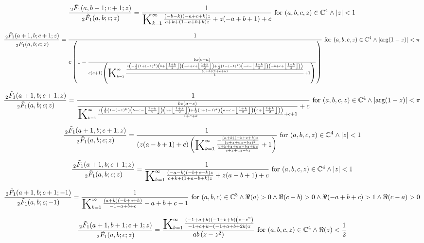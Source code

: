 \documentclass{article}
\newcommand{\bigK}{\mathop{\raisebox{-5pt}{\huge K}}}
\begin{document}
\[\frac{\, _2\tilde{F}_1(a,b+1;c+1;z)}{\, _2\tilde{F}_1(a,b;c;z)}=\frac{1}{\bigK_{k=1}^{\infty}\frac{(-b-k) (-a+c+k) z}{c+k+(1-a+b+k) z}+z (-a+b+1)+c}\text{ for }(a,b,c,z)\in \mathbb{C}^4\land \left| z\right| <1\] 

\[\frac{\, _2\tilde{F}_1(a+1,b;c+1;z)}{\, _2\tilde{F}_1(a,b;c;z)}=\frac{1}{c \left(1-\frac{b z (c-a)}{c (c+1) \left(\bigK_{k=1}^{\infty}\frac{\frac{z \left(-\frac{1}{2} \left(1+(-1)^k\right) \left(b+\left\lfloor \frac{1+k}{2}\right\rfloor \right) \left(-a+c+\left\lfloor \frac{1+k}{2}\right\rfloor \right)+\frac{1}{2} \left(1-(-1)^k\right) \left(-a-\left\lfloor \frac{1+k}{2}\right\rfloor \right) \left(-b+c+\left\lfloor \frac{1+k}{2}\right\rfloor \right)\right)}{(c+k) (1+c+k)}}{1}+1\right)}\right)}\text{ for }(a,b,c,z)\in \mathbb{C}^4\land \left| \arg (1-z)\right| <\pi\] 

\[\frac{\, _2\tilde{F}_1(a+1,b;c+1;z)}{\, _2\tilde{F}_1(a,b;c;z)}=\frac{1}{\frac{b z (a-c)}{\bigK_{k=1}^{\infty}\frac{z \left(\frac{1}{2} \left(1-(-1)^k\right) \left(b-c-\left\lfloor \frac{1+k}{2}\right\rfloor \right) \left(a+\left\lfloor \frac{1+k}{2}\right\rfloor \right)+\frac{1}{2} \left(1+(-1)^k\right) \left(a-c-\left\lfloor \frac{1+k}{2}\right\rfloor \right) \left(b+\left\lfloor \frac{1+k}{2}\right\rfloor \right)\right)}{1+c+k}+c+1}+c}\text{ for }(a,b,c,z)\in \mathbb{C}^4\land \left| \arg (1-z)\right| <\pi\] 

\[\frac{\, _2\tilde{F}_1(a+1,b;c+1;z)}{\, _2\tilde{F}_1(a,b;c;z)}=\frac{1}{(z (a-b+1)+c) \left(\bigK_{k=1}^{\infty}\frac{-\frac{(a+k) (-b+c+k) z}{(c+z+a z-b z)^2}}{\frac{c+k+z+a z-b z+k z}{c+z+a z-b z}}+1\right)}\text{ for }(a,b,c,z)\in \mathbb{C}^4\land \left| z\right| <1\] 

\[\frac{\, _2\tilde{F}_1(a+1,b;c+1;z)}{\, _2\tilde{F}_1(a,b;c;z)}=\frac{1}{\bigK_{k=1}^{\infty}\frac{(-a-k) (-b+c+k) z}{c+k+(1+a-b+k) z}+z (a-b+1)+c}\text{ for }(a,b,c,z)\in \mathbb{C}^4\land \left| z\right| <1\] 

\[\frac{\, _2\tilde{F}_1(a+1,b;c+1;-1)}{\, _2\tilde{F}_1(a,b;c;-1)}=\frac{1}{\bigK_{k=1}^{\infty}\frac{(a+k) (-b+c+k)}{-1-a+b+c}-a+b+c-1}\text{ for }(a,b,c)\in \mathbb{C}^3\land \Re(a)>0\land \Re(c-b)>0\land \Re(-a+b+c)>1\land \Re(c-a)>0\] 

\[\frac{\, _2\tilde{F}_1(a+1,b+1;c+1;z)}{\, _2\tilde{F}_1(a,b;c;z)}=\frac{\bigK_{k=1}^{\infty}\frac{(-1+a+k) (-1+b+k) \left(z-z^2\right)}{-1+c+k-(-1+a+b+2 k) z}}{a b \left(z-z^2\right)}\text{ for }(a,b,c,z)\in \mathbb{C}^4\land \Re(z)<\frac{1}{2}\] 
\end{document}
